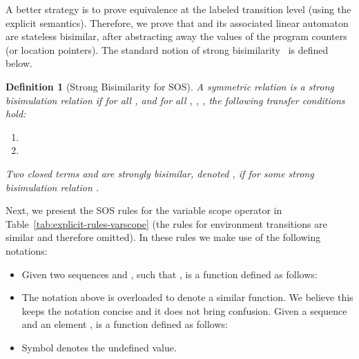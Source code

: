 \documentclass[submission,copyright,creativecommons,sharealike]{eptcs}
\newtheorem{definition}{Definition}
\begin{document}
A better strategy is to prove equivalence at the labeled transition
level (using the explicit semantics).
Therefore, we prove that  and its associated linear automaton
are stateless bisimilar, after abstracting away the values of the
program counters (or location pointers).
The standard notion of strong
bisimilarity~\cite{MousaviRenGro:CongrSOSdataArtInfComp05} is defined
below.

\begin{definition}[Strong Bisimilarity for SOS]
  A symmetric relation  is a strong bisimulation relation if for
  all , and for all , , , 
  the following transfer conditions hold:
  \begin{enumerate}
  \item 
  \item 
  \end{enumerate}
  Two closed terms  and  are strongly bisimilar, denoted , if  for some strong bisimulation relation
  .
\end{definition}

Next, we present the SOS rules for the variable scope operator in
Table~\ref{tab:explicit-rules-varscope} (the rules for environment
transitions are similar and therefore omitted). In these rules we make
use of the following notations:
\begin{itemize}
\item Given two sequences  and , such that ,  is a function defined as follows:
  
\item The notation above is overloaded to denote a similar function.
  We believe this keeps the notation concise and it does not bring
  confusion. Given a sequence  and an element ,  is a function
  defined as follows:
  
\item Symbol  denotes the undefined value.
\end{itemize}
\end{document}
